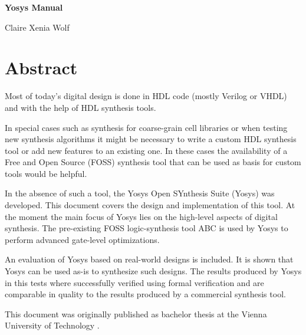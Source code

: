 \documentclass[oneside,a4paper]{book}
\begin{document}
\pagestyle{mypagestyle}

\thispagestyle{empty}
\null\vfil

\begin{center}
\bf\Huge Yosys Manual

\bigskip
\large Claire Xenia Wolf
\end{center}

\vfil\null
\eject

\chapter*{Abstract}
Most of today's digital design is done in HDL code (mostly Verilog or VHDL) and
with the help of HDL synthesis tools.

In special cases such as synthesis for coarse-grain cell libraries or when
testing new synthesis algorithms it might be necessary to write a custom HDL
synthesis tool or add new features to an existing one. In these cases the
availability of a Free and Open Source (FOSS) synthesis tool that can be used
as basis for custom tools would be helpful.

In the absence of such a tool, the Yosys Open SYnthesis Suite (Yosys) was
developed. This document covers the design and implementation of this tool.
At the moment the main focus of Yosys lies on the high-level aspects of
digital synthesis. The pre-existing FOSS logic-synthesis tool ABC is used
by Yosys to perform advanced gate-level optimizations.

An evaluation of Yosys based on real-world designs is included. It is shown
that Yosys can be used as-is to synthesize such designs. The results produced
by Yosys in this tests where successfully verified using formal verification
and are comparable in quality to the results produced by a commercial
synthesis tool.

\bigskip

This document was originally published as bachelor thesis at the Vienna
University of Technology \cite{BACC}.
\end{document}
